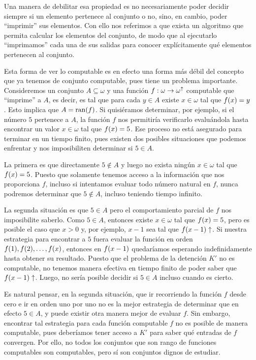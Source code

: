 Una manera de debilitar esa propiedad es no necesariamente poder decidir siempre si un elemento pertenece al conjunto o no, sino, en cambio, poder ``imprimir'' sus elementos. Con ello nos referimos a que exista un algoritmo que permita calcular los elementos del conjunto, de modo que al ejecutarlo ``imprimamos'' cada una de sus salidas para conocer explícitamente qué elementos pertenecen al conjunto.

Esta forma de ver lo computable es en efecto una forma más débil del concepto que ya tenemos de conjunto computable, pues tiene un problema importante. Consideremos un conjunto $A\subseteq\omega$ y una función $f:\omega\to\omega^{\uparrow}$ computable que ``imprime'' a $A$, es decir, es tal que para cada $y\in A$ existe $x\in\omega$ tal que $f\pa*{x} = y$. Esto implica que $A =\RANGO{f}$. Si quisiéramos determinar, por ejemplo, si el número $5$ pertenece a $A$, la función $f$ nos permitiría verificarlo evaluándola hasta encontrar un valor $x\in\omega$ tal que $f\pa*{x} = 5$. Ese proceso no está asegurado para terminar en un tiempo finito, pues existen dos posibles situaciones que podemos enfrentar y nos imposibiliten determinar si $5\in A$.

La primera es que directamente $5\notin A$ y luego no exista ningún $x\in\omega$ tal que $f\pa*{x} = 5$. Puesto que solamente tenemos acceso a la información que nos proporciona $f$, incluso si intentamos evaluar todo número natural en $f$, nunca podremos determinar que $5\notin A$, incluso teniendo tiempo infinito.

La segunda situación es que $5\in A$ pero el comportamiento parcial de $f$ nos imposibilite saberlo. Como $5\in A$, entonces existe $x\in\omega$ tal que $f\pa*{x} = 5$, pero es posible el caso que $x > 0$ y, por ejemplo, $x - 1$ sea tal que $f\pa*{x - 1}\DIVERGE$. Si nuestra estrategia para encontrar a $5$ fuera evaluar la función en orden $f\pa*{1}, f\pa*{2},\dotsc, f\pa*{x}$, entonces en $f\pa*{x - 1}$ quedaríamos esperando indefinidamente hasta obtener su resultado. Puesto que el problema de la detención $K'$ no es computable, no tenemos manera efectiva en tiempo finito de poder saber que $f\pa*{x - 1}\DIVERGE$. Luego, no sería posible decidir si $5\in A$ incluso cuando es cierto.

Es natural pensar, en la segunda situación, que ir recorriendo la función $f$ desde cero e ir en orden uno por uno no es la mejor estrategia de determinar que en efecto $5\in A$, y puede existir otra manera mejor de evaluar $f$. Sin embargo, encontrar tal estrategia para cada función computable $f$ no es posible de manera computable, pues deberíamos tener acceso a $K'$ para saber qué entradas de $f$ convergen. Por ello, no todos los conjuntos que son rango de funciones computables son computables, pero sí son conjuntos dignos de estudiar.

